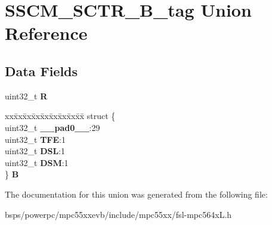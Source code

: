 \hypertarget{unionSSCM__SCTR__32B__tag}{}\section{S\+S\+C\+M\+\_\+\+S\+C\+T\+R\+\_\+B\+\_\+tag Union Reference}
\label{unionSSCM__SCTR__32B__tag}
\subsection*{Data Fields}
\begin{DoxyCompactItemize}
\item 
\mbox{\label{unionSSCM__SCTR__32B__tag_abcdd27f1343fb3bf7138c7935856b3d5}} 
uint32\+\_\+t {\bfseries R}
\item 
\mbox{\label{unionSSCM__SCTR__32B__tag_a0a637ea6aa29f99a63f5e5299b19d5ad}} 
\begin{tabbing}
xx\=xx\=xx\=xx\=xx\=xx\=xx\=xx\=xx\=\kill
struct \{\\
\>uint32\_t {\bfseries \_\_pad0\_\_}:29\\
\>uint32\_t {\bfseries TFE}:1\\
\>uint32\_t {\bfseries DSL}:1\\
\>uint32\_t {\bfseries DSM}:1\\
\} {\bfseries B}\\

\end{tabbing}\end{DoxyCompactItemize}


The documentation for this union was generated from the following file\+:\begin{DoxyCompactItemize}
\item 
bsps/powerpc/mpc55xxevb/include/mpc55xx/fsl-\/mpc564x\+L.\+h\end{DoxyCompactItemize}
